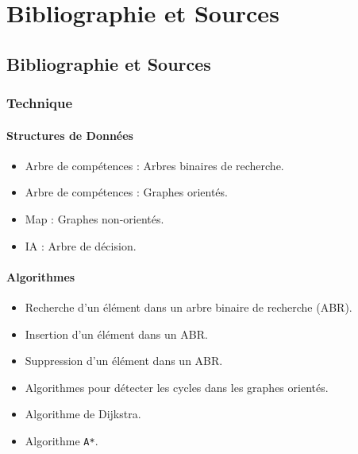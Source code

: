 \documentclass{report}
\begin{document}
\newpage
\part{Bibliographie et Sources}
\chapter{Bibliographie et Sources}
\section{Technique}

\subsection{Structures de Données}
\begin{itemize}
    \item Arbre de compétences : Arbres binaires de recherche.
    \item Arbre de compétences : Graphes orientés.
    \item Map : Graphes non-orientés.
    \item IA : Arbre de décision.
\end{itemize}

\subsection{Algorithmes}
\begin{itemize}
    \item Recherche d'un élément dans un arbre binaire de recherche (ABR).
    \item Insertion d'un élément dans un ABR.
    \item Suppression d'un élément dans un ABR.
    \item Algorithmes pour détecter les cycles dans les graphes orientés.
    \item Algorithme de Dijkstra.
    \item Algorithme \texttt{A*}.
\end{itemize}
\end{document}
